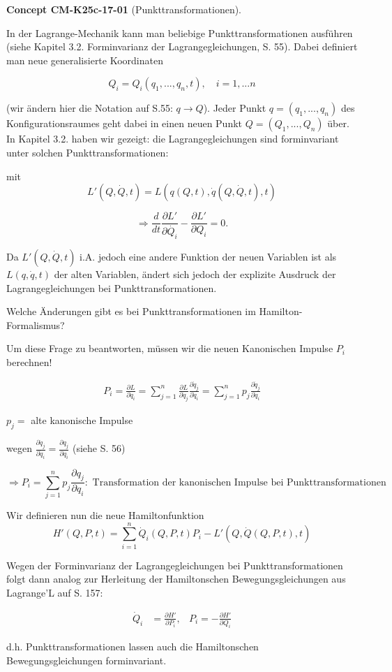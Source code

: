 \documentclass[10pt, letterpaper]{article}
\newcommand{\CustomHeading}[3]{%
  \par\medskip\noindent%
  \textbf{#1 #2} \textnormal{(#3)}.\enskip%
}
\newenvironment{CONC}[2]{\CustomHeading{Concept}{#1}{#2}}{}
\begin{document}
\begin{CONC}{CM-K25c-17-01}{Punkttransformationen}
In der Lagrange-Mechanik kann man beliebige Punkttransformationen ausführen (siehe Kapitel 3.2. Forminvarianz der Lagrangegleichungen, S. 55). Dabei definiert man neue generalisierte Koordinaten

\[Q_i = Q_i(q_1,...,q_n,t), \quad i=1,...n\]

(wir ändern hier die Notation auf S.55: $q \rightarrow Q$).
Jeder Punkt $q=(q_1,...,q_n)$ des Konfigurationsraumes geht dabei in einen neuen Punkt $Q=(Q_1,...,Q_n)$ über. In Kapitel 3.2. haben wir gezeigt: die Lagrangegleichungen sind forminvariant unter solchen Punkttransformationen:

mit \[L'(Q,\dot{Q},t) = L(q(Q,t),\dot{q}(Q,\dot{Q},t),t)\]

\[\Rightarrow \frac{d}{dt}\frac{\partial L'}{\partial \dot{Q_i}} - \frac{\partial L'}{\partial Q_i} = 0.\]

Da $L'(Q,\dot{Q},t)$ i.A. jedoch eine andere Funktion der neuen Variablen ist als $L(q,\dot{q},t)$ der alten Variablen, ändert sich jedoch der explizite Ausdruck der Lagrangegleichungen bei Punkttransformationen.

Welche Änderungen gibt es bei Punkttransformationen im Hamilton-Formalismus?

Um diese Frage zu beantworten, müssen wir die neuen Kanonischen Impulse $P_i$ berechnen!


\begin{align*}
P_i = \frac{\partial L}{\partial \dot{q}_i} = \sum_{j=1}^n \frac{\partial L}{\partial \dot{q}_j} \frac{\partial \dot{q}_j}{\partial \dot{q}_i} = \sum_{j=1}^n p_j \frac{\partial \dot{q}_j}{\partial \dot{q}_i}
\end{align*}

$p_j = $ alte kanonische Impulse

wegen $\frac{\partial \dot{q}_j}{\partial \dot{q}_i} = \frac{\partial q_j}{\partial q_i}$ (siehe S. 56)

\begin{equation*}
\Rightarrow P_i = \sum_{j=1}^n p_j \frac{\partial q_j}{\partial q_i} : \text{ Transformation der kanonischen Impulse bei Punkttransformationen}
\end{equation*}

Wir definieren nun die neue Hamiltonfunktion
\begin{equation*}
H'(Q,P,t) = \sum_{i=1}^n \dot{Q}_i(Q,P,t)P_i - L'(Q,\dot{Q}(Q,P,t),t)
\end{equation*}

Wegen der Forminvarianz der Lagrangegleichungen bei Punkttransformationen folgt dann analog zur Herleitung der Hamiltonschen Bewegungsgleichungen aus Lagrange'L auf S. 157:

\begin{align*}
\dot{Q}_i &= \frac{\partial H'}{\partial P_i}, & P_i = -\frac{\partial H'}{\partial Q_i}
\end{align*}

d.h. Punkttransformationen lassen auch die Hamiltonschen Bewegungsgleichungen forminvariant.
\end{CONC}
\end{document}
